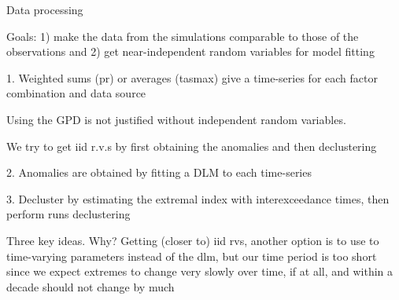 \documentclass[mathserif, 11pt, t]{beamer}
\begin{document}
\begin{frame}{Data processing}

Goals: 1) make the data from the simulations comparable to those of the observations and 2) get near-independent random variables for model fitting

1. Weighted sums (pr) or averages (tasmax) give a time-series for each factor combination and data source

Using the GPD is not justified without independent random variables.

We try to get iid r.v.s by first obtaining the anomalies and then declustering

2. Anomalies are obtained by fitting a DLM to each time-series

3. Decluster by estimating the extremal index with interexceedance times, then perform runs declustering

Three key ideas. Why? Getting (closer to) iid rvs, another option is to use to time-varying parameters instead of the dlm, but our time period is too short since we expect extremes to change very slowly over time, if at all, and within a decade should not change by much

\end{frame}


% 
% 
% 
\end{document}
